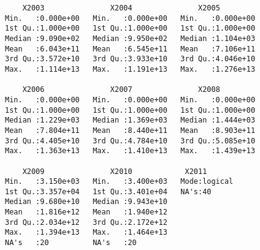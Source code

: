 \documentclass[xcolor={usenames,svgnames,dvipsnames}]{beamer}
\begin{document}
\begin{frame}[fragile]
\begin{verbatim}
    X2003               X2004               X2005          
Min.   :0.000e+00   Min.   :0.000e+00   Min.   :0.000e+00  
1st Qu.:1.000e+00   1st Qu.:1.000e+00   1st Qu.:1.000e+00  
Median :9.090e+02   Median :9.950e+02   Median :1.104e+03  
Mean   :6.043e+11   Mean   :6.545e+11   Mean   :7.106e+11  
3rd Qu.:3.572e+10   3rd Qu.:3.933e+10   3rd Qu.:4.046e+10  
Max.   :1.114e+13   Max.   :1.191e+13   Max.   :1.276e+13  
                                                           
    X2006               X2007               X2008          
Min.   :0.000e+00   Min.   :0.000e+00   Min.   :0.000e+00  
1st Qu.:1.000e+00   1st Qu.:1.000e+00   1st Qu.:1.000e+00  
Median :1.229e+03   Median :1.369e+03   Median :1.444e+03  
Mean   :7.804e+11   Mean   :8.440e+11   Mean   :8.903e+11  
3rd Qu.:4.405e+10   3rd Qu.:4.784e+10   3rd Qu.:5.085e+10  
Max.   :1.363e+13   Max.   :1.410e+13   Max.   :1.439e+13  
                                                           
    X2009               X2010            X2011        
Min.   :3.150e+03   Min.   :3.400e+03   Mode:logical  
1st Qu.:3.357e+04   1st Qu.:3.401e+04   NA's:40       
Median :9.680e+10   Median :9.943e+10                 
Mean   :1.816e+12   Mean   :1.940e+12                 
3rd Qu.:2.034e+12   3rd Qu.:2.172e+12                 
Max.   :1.394e+13   Max.   :1.464e+13                 
NA's   :20          NA's   :20
\end{verbatim}
\end{frame}
\end{document}
